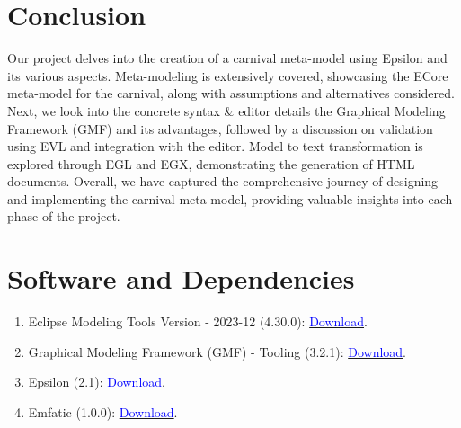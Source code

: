 \documentclass[a4paper,11pt]{report}
\begin{document}

\section{Conclusion}

Our project delves into the creation of a carnival meta-model using Epsilon and its various aspects. Meta-modeling is extensively covered, showcasing the ECore meta-model for the carnival, along with assumptions and alternatives considered. Next, we look into the concrete syntax \& editor details the Graphical Modeling Framework (GMF) and its advantages, followed by a discussion on validation using EVL and integration with the editor. Model to text transformation is explored through EGL and EGX, demonstrating the generation of HTML documents. Overall, we have captured the comprehensive journey of designing and implementing the carnival meta-model, providing valuable insights into each phase of the project.


\section{Software and Dependencies}
\begin{enumerate}
	 

\item Eclipse Modeling Tools Version - 2023-12 (4.30.0): \href{https://www.eclipse.org/downloads/packages/release/2023-12/r/eclipse-modeling-tools}{\textcolor{blue}{Download}}. 

\item Graphical Modeling Framework (GMF) - Tooling (3.2.1): \href{https://download.eclipse.org/modeling/gmp/gmf-tooling/updates/releases-3.2.1/}{\textcolor{blue}{Download}}.

\item Epsilon (2.1): \href{https://download.eclipse.org/epsilon/updates/2.1/}{\textcolor{blue}{Download}}.

\item Emfatic (1.0.0): \href{https://download.eclipse.org/emfatic/update/}{\textcolor{blue}{Download}}.

\end{enumerate}

\end{document}
